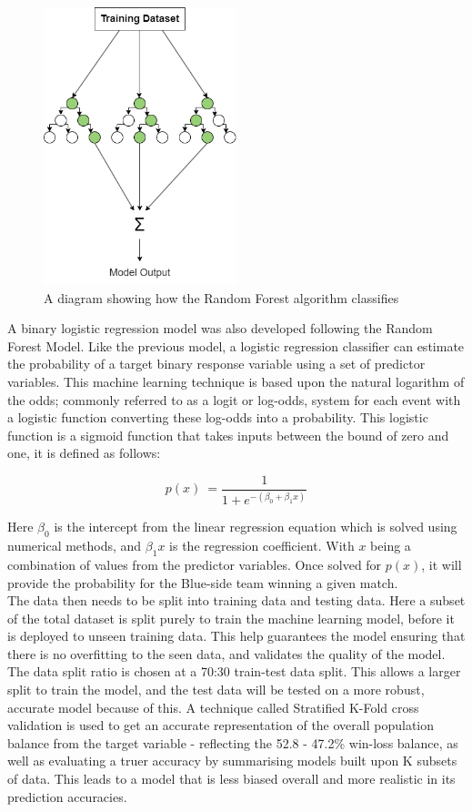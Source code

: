 \begin{figure}[h!]
    \centering
    \includegraphics[width=0.5\textwidth]{figures/RandomForest}
    \caption{A diagram showing how the Random Forest algorithm classifies}
    \label{fig:RandomForest}
\end{figure}

A binary logistic regression model was also developed following the Random Forest Model.
Like the previous model, a logistic regression classifier can estimate the probability of a target binary response variable using a set of predictor variables.
This machine learning technique is based upon the natural logarithm of the odds;
commonly referred to as a logit or log-odds, system for each event with a logistic function converting these log-odds into a probability.
This logistic function is a sigmoid function that takes inputs between the bound of zero and one, it is defined as follows:

\[ p(x) \:= \frac{1}{1 + e^{-(\beta_0 + \beta_1 x)}} \]

Here \(\beta_{0}\) is the intercept from the linear regression equation which is solved using numerical methods, and \(\beta_{1}x\) is the regression coefficient.
With \(x\) being a combination of values from the predictor variables.
Once solved for \(p(x)\), it will provide the probability for the Blue-side team winning a given match. \\

The data then needs to be split into training data and testing data.
Here a subset of the total dataset is split purely to train the machine learning model, before it is deployed to unseen training data.
This help guarantees the model ensuring that there is no overfitting to the seen data, and validates the quality of the model.
The data split ratio is chosen at a 70:30 train-test data split.
This allows a larger split to train the model, and the test data will be tested on a more robust, accurate model because of this.
A technique called Stratified K-Fold cross validation is used to get an accurate representation of the overall population balance from the target variable - reflecting the 52.8 - 47.2\% win-loss balance, as well as evaluating a truer accuracy by summarising models built upon K subsets of data.
This leads to a model that is less biased overall and more realistic in its prediction accuracies. \\

